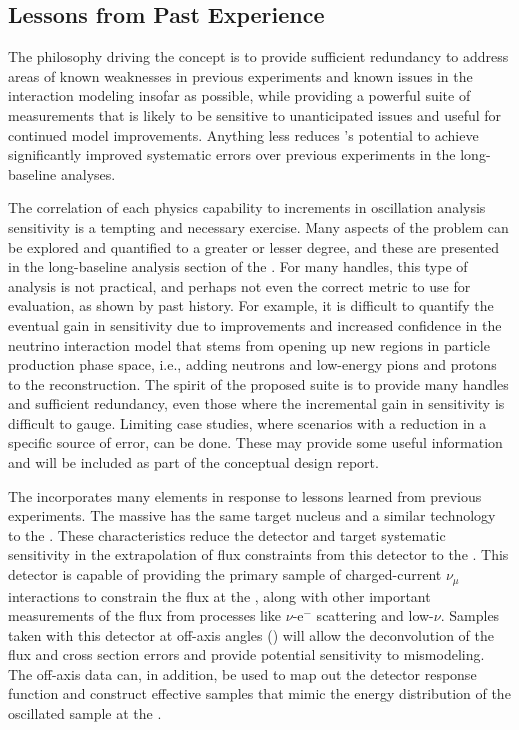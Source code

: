 \subsection{Lessons from Past Experience}
\label{ssec:exsum-nd-overview-experience}

The philosophy driving the    concept is to provide sufficient redundancy to address areas of known weaknesses in previous experiments and known issues in the interaction modeling insofar as possible, while providing a powerful suite of measurements that is likely to be sensitive to unanticipated issues and useful for continued model improvements.  Anything less reduces 's potential to achieve significantly improved systematic errors over previous experiments in the long-baseline analyses. 

The correlation of each physics capability to increments in oscillation analysis sensitivity is a tempting and necessary exercise.  Many aspects of the problem can be explored and quantified to a greater or lesser degree, and these are presented in the long-baseline analysis section of the .  For many handles, this type of analysis is not practical, and perhaps not even the correct metric to use for evaluation, as shown by past history. For example, it is difficult to quantify the eventual gain in  sensitivity due to improvements and increased confidence in the neutrino interaction model that stems from opening up new regions in particle production phase space, i.e., adding neutrons and low-energy pions and protons to the reconstruction.  The spirit of the proposed   suite is to provide many handles and sufficient redundancy, even those where the incremental gain in  sensitivity is difficult to gauge. Limiting case studies, where scenarios with a reduction in a specific source of error, can be done. These may provide some useful information and will be included as part of the    conceptual design report.  

The    incorporates many elements in response to lessons learned from previous experiments. 
The massive    has the same target nucleus and a similar technology to the  . These characteristics reduce the detector and target systematic sensitivity in the  extrapolation of flux constraints from this detector to the  .  This detector is capable of providing the primary  sample of charged-current $\nu_{\mu}$ interactions to constrain the flux at the  , along with other important measurements of the flux from processes like $\nu$-e$^{-}$ scattering and low-$\nu$.  Samples taken with this detector at off-axis angles () will allow the deconvolution of the flux and cross section errors and provide potential sensitivity to mismodeling.  The off-axis data can, in addition, be used to map out the detector response function and construct effective   samples that mimic the energy distribution of the oscillated sample at the  . 

